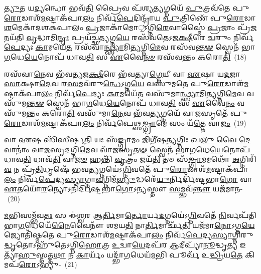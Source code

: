 \-\ul{𑌤𑍍𑌯𑍁}\-𑌤 𑌯\-\ul{𑌦𑍍𑌯}\-𑌨𑍍𑌧𑍋 𑌭𑌵᳴\-\ul{𑌤𑌿} 𑌪𑍍𑌰𑍈𑌵 𑌪᳴𑌶𑍍𑌯\-\ul{𑌤𑍍𑌯}\-𑌗𑍍𑌨𑌯𑍇᳴ \ul{𑌪𑍁}\-𑌤𑍍𑌰𑌵᳴𑌤𑍇 𑌪𑍁\-\ul{𑌰𑍋}\-𑌡𑌾𑌶᳴\-\-\ul{𑌮}\-𑌷𑍍𑌟𑌾\-𑌕᳴𑌪𑌾\-\ul{𑌲𑌂} 𑌨𑌿𑌰𑍍𑌵᳴\-\ul{𑌪𑍇}\-𑌦𑌿𑌨𑍍𑌦𑍍𑌰𑌾᳴𑌯 \ul{𑌪𑍁}\-𑌤𑍍𑌰𑌿𑌣𑍇᳴ 𑌪𑍁\-\ul{𑌰𑍋}\-𑌡𑌾\-\ul{𑌶}\-𑌮𑍇𑌕𑌾᳴\-𑌦𑌶\-𑌕𑌪𑌾𑌲𑌂 \ul{𑌪𑍍𑌰}\-𑌜𑌾𑌕𑌾᳴𑌮𑍋़॒\-𑌽𑌗𑍍𑌨𑌿\-\ul{𑌰𑍇}\-𑌵𑌾𑌸𑍍𑌮𑍈॑ \ul{𑌪𑍍𑌰}\-𑌜𑌾𑌂 𑌪𑍍𑌰᳴\-\ul{𑌜}\-𑌨𑌯᳴𑌤𑌿 \ul{𑌵𑍃}\-𑌦𑍍𑌧𑌾𑌮𑌿\-\ul{𑌨𑍍𑌦𑍍𑌰𑌃} 𑌪𑍍𑌰𑌯᳴𑌚𑍍𑌛\-\ul{𑌤𑍍𑌯}\-𑌗𑍍𑌨\-\ul{𑌯𑍇} 𑌰𑌸᳴𑌵𑌤𑍇\-𑌽𑌜\-\ul{𑌕𑍍𑌷𑍀}\-𑌰𑍇 \ul{𑌚}\-𑌰𑍁𑌂 𑌨𑌿𑌰𑍍𑌵᳴\-\ul{𑌪𑍇}\-𑌦𑍍𑌯𑌃 \ul{𑌕𑌾}\-𑌮𑌯𑍇᳴\-\ul{𑌤} 𑌰𑌸᳴𑌵𑌾\-\ul{𑌨𑍍𑌥𑍍𑌸𑍍𑌯𑌾}\-𑌮𑌿\-\ul{𑌤𑍍𑌯}\-𑌗𑍍𑌨𑌿\-\ul{𑌮𑍇}\-𑌵 𑌰𑌸᳴𑌵\-\ul{𑌨𑍍𑌤}\-\-\ul{𑍟} 𑌸𑍍𑌵𑍇𑌨᳴ 𑌭𑌾\-\ul{𑌗}\-𑌧𑍇\-\ul{𑌯𑍇}\-𑌨𑍋𑌪᳴ 𑌧𑌾𑌵\-\ul{𑌤𑌿} 𑌸 \ul{𑌏}\-𑌵𑍈\-\ul{𑌨}\-\-\ul{𑍞} 𑌰𑌸᳴𑌵𑌨𑍍𑌤𑌂 𑌕𑌰𑍋\-\ul{𑌤𑌿}\-~(18)

𑌰𑌸᳴𑌵𑌾\-\ul{𑌨𑍇}\-𑌵 𑌭᳴𑌵𑌤𑍍𑌯𑌜\-\ul{𑌕𑍍𑌷𑍀}\-𑌰𑍇 𑌭᳴𑌵𑌤𑍍𑌯𑌾\-\ul{𑌗𑍍𑌨𑍇}\-𑌯𑍀 𑌵𑌾 \ul{𑌏}\-𑌷𑌾 𑌯\-\ul{𑌦}\-𑌜𑌾 \ul{𑌸𑌾}\-𑌕𑍍𑌷𑌾\-\ul{𑌦𑍇}\-𑌵 𑌰\-\ul{𑌸}\-𑌮𑌵᳴\-𑌰𑍁\-\ul{𑌨𑍍𑌧𑍇}\-\-𑌽𑌗𑍍𑌨\-\ul{𑌯𑍇} 𑌵𑌸𑍁᳴𑌮𑌤𑍇 𑌪𑍁\-\ul{𑌰𑍋}\-𑌡𑌾𑌶᳴\-\-\ul{𑌮}\-𑌷𑍍𑌟𑌾\-𑌕᳴𑌪𑌾\-\ul{𑌲𑌂} 𑌨𑌿𑌰𑍍𑌵᳴\-\ul{𑌪𑍇}\-𑌦𑍍𑌯𑌃 \ul{𑌕𑌾}\-𑌮𑌯𑍇᳴\-\ul{𑌤} 𑌵𑌸𑍁᳴𑌮𑌾\-\ul{𑌨𑍍𑌥𑍍𑌸𑍍𑌯𑌾}\-𑌮𑌿\-\ul{𑌤𑍍𑌯}\-𑌗𑍍𑌨𑌿\-\ul{𑌮𑍇}\-𑌵 𑌵𑌸𑍁᳴𑌮\-\ul{𑌨𑍍𑌤}\-\-\ul{𑍟} 𑌸𑍍𑌵𑍇𑌨᳴ 𑌭𑌾\-\ul{𑌗}\-𑌧𑍇\-\ul{𑌯𑍇}\-𑌨𑍋𑌪᳴ 𑌧𑌾𑌵\-\ul{𑌤𑌿} 𑌸 \ul{𑌏}\-𑌵𑍈\-\ul{𑌨𑌂} 𑌵𑌸𑍁᳴𑌮𑌨𑍍𑌤𑌂 𑌕𑌰𑍋\-\ul{𑌤𑌿} 𑌵𑌸𑍁᳴𑌮𑌾\-\ul{𑌨𑍇}\-𑌵 𑌭᳴𑌵\-\ul{𑌤𑍍𑌯}\-𑌗𑍍𑌨𑌯𑍇᳴ 𑌵𑌾\-\ul{𑌜}\-𑌸𑍃𑌤𑍇᳴ 𑌪𑍁\-\ul{𑌰𑍋}\-𑌡𑌾𑌶᳴\-\-\ul{𑌮}\-𑌷𑍍𑌟𑌾\-𑌕᳴𑌪𑌾\-\ul{𑌲𑌂} 𑌨𑌿𑌰𑍍𑌵᳴𑌪𑍇𑌥𑍍𑌸\-\ul{𑌙𑍍𑌗𑍍𑌰𑌾}\-𑌮𑍇 𑌸𑌂 𑌯᳴\-\ul{𑌤𑍍𑌤𑍇} 𑌵𑌾\-\ul{𑌜𑌂}\-~(19)

𑌵𑌾 \ul{𑌏}\-𑌷 𑌸𑌿᳴𑌸𑍀𑌰𑍍\mbox{}𑌷\-\ul{𑌤𑌿} 𑌯𑌃 𑌸᳴\-\ul{𑌙𑍍𑌗𑍍𑌰𑌾}\-𑌮𑌂 𑌜𑌿𑌗𑍀᳴𑌷\-\ul{𑌤𑍍𑌯}\-𑌗𑍍𑌨𑌿𑌃 𑌖\-\ul{𑌲𑍁} 𑌵𑍈 \ul{𑌦𑍇}\-𑌵𑌾𑌨𑌾𑌂॑ 𑌵𑌾\-\ul{𑌜}\-𑌸𑍃\-\ul{𑌦}\-𑌗𑍍𑌨𑌿\-\ul{𑌮𑍇}\-𑌵 𑌵𑌾᳴\-\ul{𑌜}\-𑌸𑍃\-\ul{𑌤}\-\-\ul{𑍟} 𑌸𑍍𑌵𑍇𑌨᳴ 𑌭𑌾\-\ul{𑌗}\-𑌧𑍇\-\ul{𑌯𑍇}\-𑌨𑍋𑌪᳴ 𑌧𑌾𑌵\-\ul{𑌤𑌿} 𑌧𑌾𑌵᳴\-\ul{𑌤𑌿} 𑌵𑌾\-\ul{𑌜}\-\-\ul{𑍞} 𑌹𑌨𑍍𑌤𑌿᳴ \ul{𑌵𑍃}\-𑌤𑍍𑌰𑌂 𑌜𑌯᳴\-\ul{𑌤𑌿} 𑌤𑍞 𑌸᳴\-\ul{𑌙𑍍𑌗𑍍𑌰𑌾}\-𑌮𑌮𑌥𑍋᳴ \ul{𑌅}\-𑌗𑍍𑌨𑌿𑌰𑌿᳴\-\ul{𑌵} 𑌨 𑌪𑍍𑌰᳴\-\ul{𑌤𑌿}\-𑌧𑍃𑌷𑍇᳴ 𑌭𑌵\-\ul{𑌤𑍍𑌯}\-𑌗𑍍𑌨𑌯𑍇॑\-𑌽\-\ul{𑌗𑍍𑌨𑌿}\-𑌵𑌤𑍇᳴ 𑌪𑍁\-\ul{𑌰𑍋}\-𑌡𑌾𑌶᳴\-\-\ul{𑌮}\-𑌷𑍍𑌟𑌾\-𑌕᳴𑌪𑌾\-\ul{𑌲𑌂} 𑌨𑌿𑌰𑍍𑌵᳴\-\ul{𑌪𑍇}\-𑌦𑍍𑌯\-\ul{𑌸𑍍𑌯𑌾}\-𑌗𑍍𑌨𑌾\-\ul{𑌵}\-𑌗𑍍𑌨𑌿𑌮᳴\-\ul{𑌭𑍍𑌯𑍁}\-𑌦𑍍𑌧𑌰𑍇᳴\-\ul{𑌯𑍁}\-𑌰𑍍𑌨𑌿𑌰𑍍𑌦𑌿᳴𑌷𑍍𑌟𑌭𑌾\-\ul{𑌗𑍋} 𑌵𑌾 \ul{𑌏}\-𑌤𑌯𑍋᳴\-\ul{𑌰}\-𑌨𑍍𑌯𑍋\-𑌽𑌨𑌿᳴𑌰𑍍𑌦𑌿𑌷𑍍𑌟𑌭𑌾\-\ul{𑌗𑍋}\-\-𑌽𑌨𑍍𑌯𑌸𑍍𑌤𑍗 \ul{𑌸}\-𑌮𑍍𑌭𑌵᳴\-\ul{𑌨𑍍𑌤𑍗} 𑌯𑌜᳴𑌮𑌾𑌨-~(20)

\-\ul{𑌮}\-𑌭𑌿𑌸𑌮𑍍𑌭᳴𑌵\-\ul{𑌤𑌃} 𑌸 𑌈॑\-\ul{𑌶𑍍𑌵}\-𑌰 𑌆\-\ul{𑌰𑍍𑌤𑌿}\-𑌮𑌾\-\ul{𑌰𑍍𑌤𑍋}\-𑌰𑍍𑌯\-\ul{𑌦}\-𑌗𑍍𑌨𑌯𑍇॑\-𑌽\-\ul{𑌗𑍍𑌨𑌿}\-𑌵𑌤𑍇᳴ \ul{𑌨𑌿}\-𑌰𑍍𑌵𑌪᳴𑌤𑌿 𑌭𑌾\-\ul{𑌗}\-𑌧𑍇𑌯𑍇᳴\-\ul{𑌨𑍈}\-𑌵𑍈𑌨𑍗᳴ 𑌶𑌮𑌯\-\ul{𑌤𑌿} 𑌨𑌾\-\ul{𑌰𑍍𑌤𑌿}\-𑌮𑌾𑌰𑍍𑌛᳴\-\ul{𑌤𑌿} 𑌯𑌜᳴𑌮𑌾\-\ul{𑌨𑍋}\-\-𑌽𑌗𑍍𑌨\-\ul{𑌯𑍇} 𑌜𑍍𑌯𑍋𑌤𑌿᳴𑌷𑍍𑌮𑌤𑍇 𑌪𑍁\-\ul{𑌰𑍋}\-𑌡𑌾𑌶᳴\-\-\ul{𑌮}\-𑌷𑍍𑌟𑌾\-𑌕᳴𑌪𑌾\-\ul{𑌲𑌂} 𑌨𑌿𑌰𑍍𑌵᳴\-\ul{𑌪𑍇}\-𑌦𑍍𑌯\-\ul{𑌸𑍍𑌯𑌾}\-𑌗𑍍𑌨𑌿𑌰𑍁\-\ul{𑌦𑍍𑌧𑍃}\-𑌤𑍋\-𑌽𑌹𑍁᳴𑌤𑍇\-𑌽𑌗𑍍𑌨𑌿\-\ul{𑌹𑍋}\-𑌤𑍍𑌰 \ul{𑌉}\-𑌦𑍍𑌵𑌾\-\ul{𑌯𑍇}\-𑌦𑌪᳴𑌰 \ul{𑌆}\-𑌦𑍀𑌪𑍍𑌯𑌾᳴\-\ul{𑌨𑍂}\-𑌦𑍍𑌧𑍃\-\ul{𑌤𑍍𑌯} 𑌇𑌤𑍍𑌯𑌾᳴\-\ul{𑌹𑍁}\-𑌸𑍍𑌤𑌤𑍍𑌤\-\ul{𑌥𑌾} 𑌨 \ul{𑌕𑌾}\-𑌰𑍍𑌯𑌂᳴ 𑌯𑌦𑍍𑌭𑌾᳴\-\ul{𑌗}\-𑌧𑍇𑌯᳴\-\ul{𑌮}\-𑌭𑌿 𑌪𑍂𑌰𑍍𑌵᳴ 𑌉\-\ul{𑌦𑍍𑌧𑍍𑌰𑌿}\-𑌯\-\ul{𑌤𑍇} 𑌕𑌿𑌮𑌪᳴\-\ul{𑌰𑍋}\-\-𑌽𑌭𑍍𑌯𑍁-~(21)


